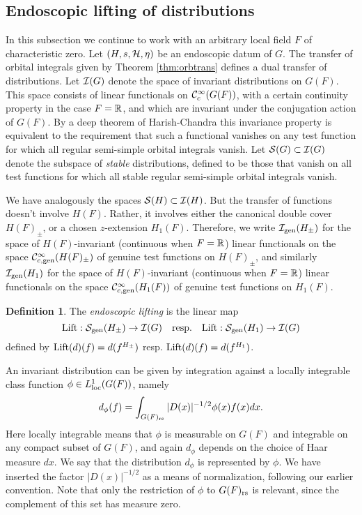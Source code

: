 \documentclass{article}
\theoremstyle{definition}
\newtheorem{dfn}[thm]{Definition}
\numberwithin{equation}{section}
\renewcommand{\-}{\hyp{}}
\begin{document}
\subsection{Endoscopic lifting of distributions}

In this subsection we continue to work with an arbitrary local field $F$ of characteristic zero. Let $(H,s,\mathcal{H},\eta)$ be an endoscopic datum of $G$. The transfer of orbital integrals given by Theorem \ref{thm:orbtrans} defines a dual transfer of distributions. Let $\mathcal{I}(G)$ denote the space of invariant distributions on $G(F)$. This space consists of linear functionals on $\mathcal{C}^\infty_c(G(F))$, with a certain continuity property in the case $F=\mathbb{R}$, and which are invariant under the conjugation action of $G(F)$. By a deep theorem of Harish-Chandra this invariance property is equivalent to the requirement that such a functional vanishes on any test function for which all regular semi-simple orbital integrals vanish. Let $\mathcal{S}(G) \subset \mathcal{I}(G)$ denote the subspace of \emph{stable} distributions, defined to be those that vanish on all test functions for which all stable regular semi-simple orbital integrals vanish.

We have analogously the spaces $\mathcal{S}(H) \subset \mathcal{I}(H)$. But the transfer of functions doesn't involve $H(F)$. Rather, it involves either the canonical double cover $H(F)_\pm$, or a chosen $z$-extension $H_1(F)$. Therefore, we write $\mathcal{I}_{\textrm{gen}}(H_\pm)$ for the space of $H(F)$-invariant (continuous when $F=\mathbb{R}$) linear functionals on the space $\mathcal{C}^\infty_{c,\textrm{gen}}(H(F)_\pm)$ of genuine test functions on $H(F)_\pm$, and similarly $\mathcal{I}_{\textrm{gen}}(H_1)$ for the space of $H(F)$-invariant (continuous when $F=\mathbb{R}$) linear functionals on the space $\mathcal{C}^\infty_{c,\textrm{gen}}(H_1(F))$ of genuine test functions on $H_1(F)$.

\begin{dfn} \label{dfn:stabtrans}
The \emph{endoscopic lifting} is the linear map 
\[ \textrm{Lift} : \mathcal{S}_{\textrm{gen}}(H_\pm) \to \mathcal{I}(G) \quad \textrm{resp.}\quad \textrm{Lift} : \mathcal{S}_{\textrm{gen}}(H_1) \to \mathcal{I}(G)\] 
defined by $\textrm{Lift}(d)(f)=d(f^{H_\pm})$ resp. $\textrm{Lift}(d)(f)=d(f^{H_1})$.
\end{dfn}

An invariant distribution can be given by integration against a locally integrable class function $\phi \in L^1_{\textrm{loc}}(G(F))$, namely 
\[ d_\phi(f) = \int_{G(F)_{\textrm{rs}}} |D(x)|^{-1/2}\phi(x)f(x)dx. \]
Here locally integrable means that $\phi$ is measurable on $G(F)$ and integrable on any compact subset of $G(F)$, and again $d_\phi$ depends on the choice of Haar measure $dx$. We say that the distribution $d_\phi$ is represented by $\phi$. We have inserted the factor $|D(x)|^{-1/2}$ as a means of normalization, following our earlier convention. Note that only the restriction of $\phi$ to $G(F)_{\textrm{rs}}$ is relevant, since the complement of this set has measure zero.
\end{document}
